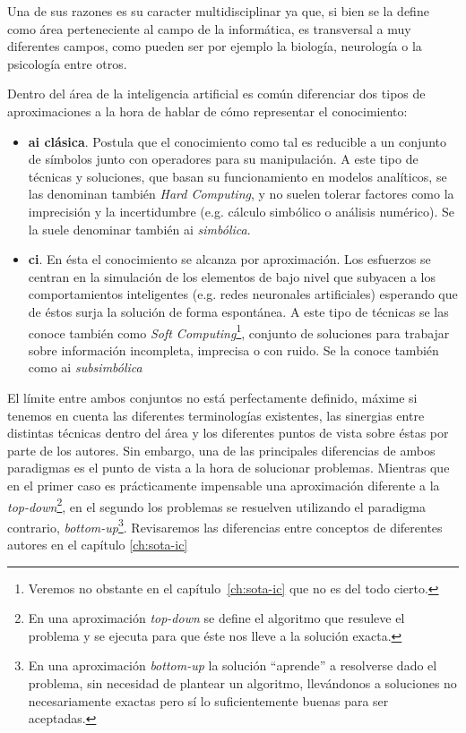 Una de sus razones es su caracter multidisciplinar ya que, si bien se la define como área perteneciente al campo de la informática, es transversal a muy diferentes campos, como pueden ser por ejemplo la biología, neurología o la psicología entre otros.

Dentro del área de la inteligencia artificial es común diferenciar dos tipos de aproximaciones a la hora de hablar de cómo representar el conocimiento:

\begin{itemize}
	\item \textbf{\ac{ai} clásica}. Postula que el conocimiento como tal es reducible a un conjunto de símbolos junto con operadores para su manipulación. A este tipo de técnicas y soluciones, que basan su funcionamiento en modelos analíticos, se las denominan también \textit{Hard Computing}, y no suelen tolerar factores como la imprecisión y la incertidumbre (e.g. cálculo simbólico o análisis numérico). Se la suele denominar también \ac{ai} \textit{simbólica}.
	\item \textbf{\ac{ci}}. En ésta el conocimiento se alcanza por aproximación. Los esfuerzos se centran en la simulación de los elementos de bajo nivel que subyacen a los comportamientos inteligentes (e.g. redes neuronales artificiales) esperando que de éstos surja la solución de forma espontánea. A este tipo de técnicas se las conoce también como \textit{Soft Computing}\footnote{Veremos no obstante en el capítulo~\ref{ch:sota-ic} que no es del todo cierto.}, conjunto de soluciones para trabajar sobre información incompleta, imprecisa o con ruido. Se la conoce también como \ac{ai} \textit{subsimbólica}
\end{itemize}

El límite entre ambos conjuntos no está perfectamente definido, máxime si tenemos en cuenta las diferentes terminologías existentes, las sinergias entre distintas técnicas dentro del área y los diferentes puntos de vista sobre éstas por parte de los autores. Sin embargo, una de las principales diferencias de ambos paradigmas es el punto de vista a la hora de solucionar problemas. Mientras que en el primer caso es prácticamente impensable una aproximación diferente a la \textit{top-down}\footnote{En una aproximación \textit{top-down} se define el algoritmo que resuleve el problema y se ejecuta para que éste nos lleve a la solución exacta.}, en el segundo los problemas se resuelven utilizando el paradigma contrario, \textit{bottom-up}\footnote{En una aproximación \textit{bottom-up} la solución \enquote{aprende} a resolverse dado el problema, sin necesidad de plantear un algoritmo, llevándonos a soluciones no necesariamente exactas pero sí lo suficientemente buenas para ser aceptadas.}. Revisaremos las diferencias entre conceptos de diferentes autores en el capítulo \ref{ch:sota-ic}

